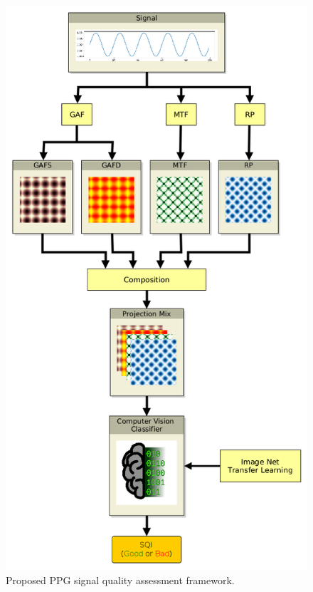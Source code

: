 \begin{figure}[!h]
	\centering
	\includegraphics[height=0.7\textheight]{img/method.png}
	\caption{Proposed \acrlong{PPG} signal quality assessment framework.}
	\label{fig:method}
\end{figure}
